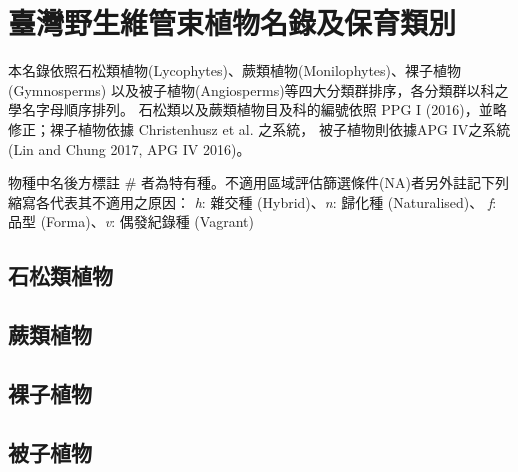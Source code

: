\chapter{臺灣野生維管束植物名錄及保育類別}

\begin{small}
\linespread{1.5}\selectfont
本名錄依照石松類植物(Lycophytes)、蕨類植物(Monilophytes)、裸子植物(Gymnosperms)
以及被子植物(Angiosperms)等四大分類群排序，各分類群以科之學名字母順序排列。
石松類以及蕨類植物目及科的編號依照 PPG I (2016)，並略修正；裸子植物依據
Christenhusz et al. \citeyearpar{Christenhusz:2011wm}之系統，
被子植物則依據APG IV之系統(Lin and Chung 2017, APG IV 2016)。

\noindent 物種中名後方標註 \# 者為特有種。不適用區域評估篩選條件(NA)者另外註記下列縮寫各代表其不適用之原因：
\textit{h}: 雜交種 (Hybrid)、\textit{n}: 歸化種 (Naturalised)、
\textit{f}: 品型 (Forma)、\textit{v}: 偶發紀錄種 (Vagrant) \\
\end{small}

\begin{flushleft}
    \begin{multicols}{2}
    \linespread{1}\selectfont
    \section{石松類植物}
    
    \section{蕨類植物}
    
    \section{裸子植物}
    
    \section{被子植物}
    
    \end{multicols}
\end{flushleft}
